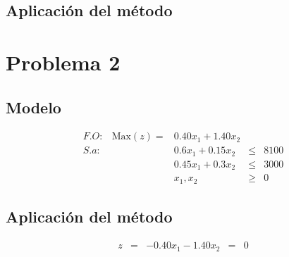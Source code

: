 \documentclass[letterpaper, 12pt]{article}
\begin{document}
    \subsection{Aplicación del método}
    \section{Problema 2}
    \subsection{Modelo}
    \[\begin{matrix}
        F.O\!:&\text{Max}(z)=&0.40x_1+1.40x_2&&\\
        S.a\!:&&0.6x_1+0.15x_2&\leq&8100\\
        &&0.45x_1+0.3x_2&\leq&3000\\
        &&x_1,x_2&\geq&0
    \end{matrix}\]
    \subsection{Aplicación del método}
    \[\begin{matrix}
        z&=&-0.40x_1-1.40x_2&=&0\\

    \end{matrix}\]
\end{document}
